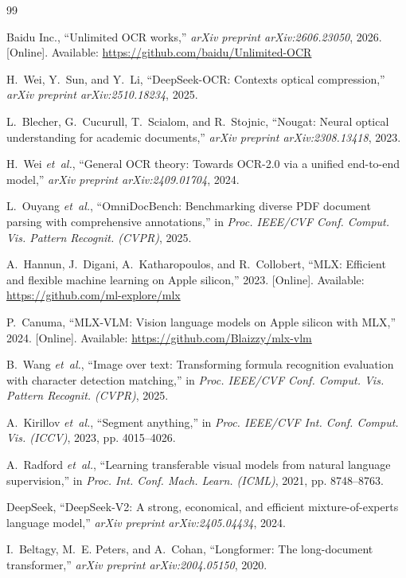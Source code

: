 \documentclass[journal]{IEEEtran}
\begin{document}
\begin{thebibliography}{99}

Baidu Inc., ``Unlimited OCR works,'' \emph{arXiv preprint arXiv:2606.23050},
2026. [Online]. Available: \url{https://github.com/baidu/Unlimited-OCR}

H.~Wei, Y.~Sun, and Y.~Li, ``DeepSeek-OCR: Contexts optical compression,''
\emph{arXiv preprint arXiv:2510.18234}, 2025.

L.~Blecher, G.~Cucurull, T.~Scialom, and R.~Stojnic, ``Nougat: Neural optical
understanding for academic documents,'' \emph{arXiv preprint arXiv:2308.13418},
2023.

H.~Wei \emph{et~al.}, ``General OCR theory: Towards OCR-2.0 via a unified
end-to-end model,'' \emph{arXiv preprint arXiv:2409.01704}, 2024.

L.~Ouyang \emph{et~al.}, ``OmniDocBench: Benchmarking diverse PDF document
parsing with comprehensive annotations,'' in \emph{Proc. IEEE/CVF Conf. Comput.
Vis. Pattern Recognit. (CVPR)}, 2025.

A.~Hannun, J.~Digani, A.~Katharopoulos, and R.~Collobert, ``MLX: Efficient and
flexible machine learning on Apple silicon,'' 2023. [Online]. Available:
\url{https://github.com/ml-explore/mlx}

P.~Canuma, ``MLX-VLM: Vision language models on Apple silicon with MLX,'' 2024.
[Online]. Available: \url{https://github.com/Blaizzy/mlx-vlm}

B.~Wang \emph{et~al.}, ``Image over text: Transforming formula recognition
evaluation with character detection matching,'' in \emph{Proc. IEEE/CVF Conf.
Comput. Vis. Pattern Recognit. (CVPR)}, 2025.

A.~Kirillov \emph{et~al.}, ``Segment anything,'' in \emph{Proc. IEEE/CVF Int.
Conf. Comput. Vis. (ICCV)}, 2023, pp. 4015--4026.

A.~Radford \emph{et~al.}, ``Learning transferable visual models from natural
language supervision,'' in \emph{Proc. Int. Conf. Mach. Learn. (ICML)}, 2021,
pp. 8748--8763.

DeepSeek, ``DeepSeek-V2: A strong, economical, and efficient
mixture-of-experts language model,'' \emph{arXiv preprint arXiv:2405.04434},
2024.

I.~Beltagy, M.~E. Peters, and A.~Cohan, ``Longformer: The long-document
transformer,'' \emph{arXiv preprint arXiv:2004.05150}, 2020.


\end{thebibliography}
\end{document}
